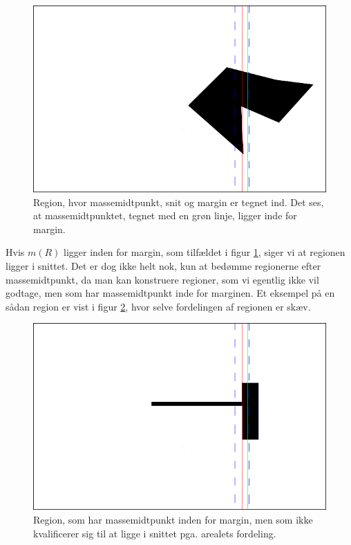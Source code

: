 {\begin{figure}[h]
    \begin{center}
        \includegraphics[scale=0.5,angle=0]{afsnit/vores_implementation/billeder/udvidet_loesning/cOMCutMargin.png}
    \end{center}
    \caption[]{Region, hvor massemidtpunkt, snit og margin er tegnet
    ind. Det ses, at massemidtpunktet, tegnet med en grøn linje, ligger
    inde for margin.}
    \label{cOMCutMargin}
\end{figure}

Hvis $m(R)$ ligger inden for margin, som tilfældet i figur
\ref{cOMCutMargin}, siger vi at regionen ligger i snittet. Det er dog
ikke helt nok, kun
at bedømme regionerne efter massemidtpunkt, da man kan konstruere
regioner, som vi egentlig ikke vil godtage, men som har massemidtpunkt inde for
marginen. Et eksempel på en sådan region er vist i figur \ref{dontwork},
hvor selve fordelingen af regionen er skæv.

\begin{figure}[h]
    \begin{center}
        \includegraphics[scale=0.5,angle=0]{afsnit/vores_implementation/billeder/udvidet_loesning/dontWork.png}
    \end{center}
    \caption[]{Region, som har massemidtpunkt inden for margin, men som
    ikke kvalificerer sig til at ligge i snittet pga. arealets
    fordeling.}
    \label{dontwork}
\end{figure}

}
